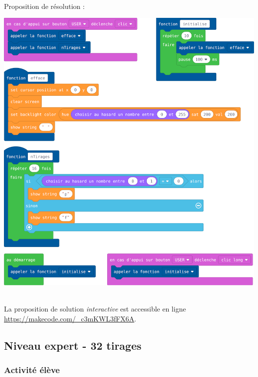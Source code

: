 \newpage

\begin{minipage}[t]{0.8\linewidth}
    \begin{methode}~\\
        Proposition de résolution :
        
        \centerline{
            \includegraphics[width=\linewidth]{res/st-pf-03-prof.png}}
    \end{methode}
\end{minipage}
\hfill
\begin{minipage}[t]{0.2\linewidth}
    \begin{remarque}~\\
    La proposition de solution \emph{interactive} est accessible en ligne \url{https://makecode.com/_c3mKWL3fFX6A}.
\end{remarque}
\end{minipage}





%
%
\newpage
\subsection{Niveau expert - 32 tirages}
\subsubsection{Activité élève}

